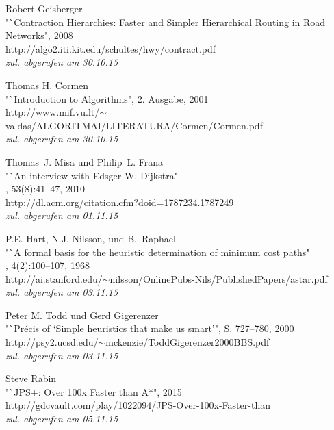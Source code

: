 \documentclass[12pt]{article}
\begin{document}
\begin{thebibliography}{99}
\clearpage

 Robert Geisberger\\
\newblock "`Contraction Hierarchies: Faster and Simpler Hierarchical Routing in Road Networks", 2008\\
\newblock http://algo2.iti.kit.edu/schultes/hwy/contract.pdf \\\emph{zul. abgerufen am 30.10.15}

 Thomas H. Cormen\\
\newblock "`Introduction to Algorithms", 2. Ausgabe, 2001\\
\newblock http://www.mif.vu.lt/$\sim$valdas/ALGORITMAI/LITERATURA/Cormen/Cormen.pdf \\\emph{zul. abgerufen am 30.10.15}

 Thomas~J. Misa und Philip~L. Frana\\
\newblock "`An interview with Edsger W. Dijkstra"\\
, 53(8):41--47, 2010\\
\newblock http://dl.acm.org/citation.cfm?doid=1787234.1787249 \\\emph{zul. abgerufen am 01.11.15}

 P.E. Hart, N.J. Nilsson, und B.~Raphael\\
\newblock "`A formal basis for the heuristic determination of minimum cost paths"\\
, 4(2):100--107, 1968\\
\newblock http://ai.stanford.edu/$\sim$nilsson/OnlinePubs-Nils/PublishedPapers/astar.pdf \\\emph{zul. abgerufen am 03.11.15}

 Peter M. Todd und Gerd Gigerenzer\\
\newblock "`Précis of `Simple heuristics that make us smart'", S. 727--780, 2000\\
\newblock http://psy2.ucsd.edu/$\sim$mckenzie/ToddGigerenzer2000BBS.pdf \\\emph{zul. abgerufen am 03.11.15}

 Steve Rabin\\
\newblock "`JPS+: Over 100x Faster than A*", 2015\\
\newblock http://gdcvault.com/play/1022094/JPS-Over-100x-Faster-than \\\emph{zul. abgerufen am 05.11.15}

\end{thebibliography}
\newpage







\end{document}
